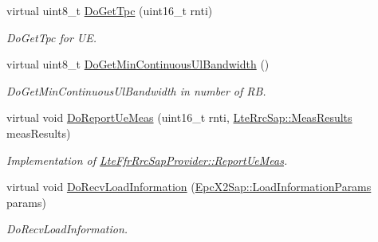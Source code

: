 \begin{DoxyCompactItemize}
virtual uint8\+\_\+t \hyperlink{classns3_1_1LteFfrDistributedAlgorithm_abc0c692f5150134e08e13e42a3c761be}{Do\+Get\+Tpc} (uint16\+\_\+t rnti)
\begin{DoxyCompactList}\small\item\em Do\+Get\+Tpc for UE. \end{DoxyCompactList}\item 
virtual uint8\+\_\+t \hyperlink{classns3_1_1LteFfrDistributedAlgorithm_aa259029bbbda9dcbca178caa090a076f}{Do\+Get\+Min\+Continuous\+Ul\+Bandwidth} ()
\begin{DoxyCompactList}\small\item\em Do\+Get\+Min\+Continuous\+Ul\+Bandwidth in number of RB. \end{DoxyCompactList}\item 
virtual void \hyperlink{classns3_1_1LteFfrDistributedAlgorithm_ab56de39fead05b50d0528f2b5404a692}{Do\+Report\+Ue\+Meas} (uint16\+\_\+t rnti, \hyperlink{structns3_1_1LteRrcSap_1_1MeasResults}{Lte\+Rrc\+Sap\+::\+Meas\+Results} meas\+Results)
\begin{DoxyCompactList}\small\item\em Implementation of \hyperlink{classns3_1_1LteFfrRrcSapProvider_aefa0779641b8432a7d3406b519ca7e59}{Lte\+Ffr\+Rrc\+Sap\+Provider\+::\+Report\+Ue\+Meas}. \end{DoxyCompactList}\item 
virtual void \hyperlink{classns3_1_1LteFfrDistributedAlgorithm_a845616424b362de65538b6c371de6bed}{Do\+Recv\+Load\+Information} (\hyperlink{structns3_1_1EpcX2Sap_1_1LoadInformationParams}{Epc\+X2\+Sap\+::\+Load\+Information\+Params} params)
\begin{DoxyCompactList}\small\item\em Do\+Recv\+Load\+Information. \end{DoxyCompactList}\end{DoxyCompactItemize}
